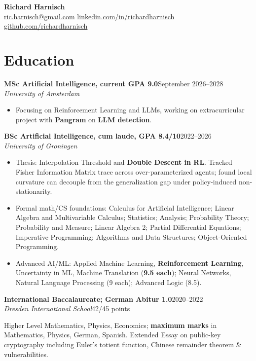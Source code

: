 \documentclass[10pt,a4paper]{article}
\newcommand{\cvheading}[4]{\textbf{#1}\hfill #2\\\emph{#3}\hfill #4\par}
\begin{document}
\begin{center}
    {\LARGE \textbf{Richard Harnisch}}\\[-0.05em]
    \href{mailto:ric.harnisch@gmail.com}{ric.harnisch@gmail.com} \quad
    \href{https://www.linkedin.com/in/richardharnisch}{linkedin.com/in/richardharnisch} \quad
    \href{https://github.com/richardharnisch}{github.com/richardharnisch}
\end{center}

\section*{Education}
\cvheading{MSc Artificial Intelligence, current GPA 9.0}{September 2026--2028}{University of Amsterdam}{}
\begin{itemize}
    \item Focusing on Reinforcement Learning and LLMs, working on extracurricular project with \textbf{Pangram} on \textbf{LLM detection}.
\end{itemize}
\cvheading{BSc Artificial Intelligence, cum laude, GPA 8.4/10}{2022--2026}{University of Groningen}{}
\begin{itemize}
    \item Thesis: Interpolation Threshold and \textbf{Double Descent in RL}. Tracked Fisher Information Matrix trace across over-parameterized agents; found local curvature can decouple from the generalization gap under policy-induced non-stationarity.
    \item Formal math/CS foundations: Calculus for Artificial Intelligence; Linear Algebra and Multivariable Calculus; Statistics; Analysis; Probability Theory; Probability and Measure; Linear Algebra 2; Partial Differential Equations; Imperative Programming; Algorithms and Data Structures; Object-Oriented Programming.
    \item Advanced AI/ML: Applied Machine Learning, \textbf{Reinforcement Learning}, Uncertainty in ML, Machine Translation (\textbf{9.5 each}); Neural Networks, Natural Language Processing (9 each); Advanced Logic (8.5).
\end{itemize}
\cvheading{International Baccalaureate; German Abitur 1.0}{2020--2022}{Dresden International School}{42/45 points}
Higher Level Mathematics, Physics, Economics; \textbf{maximum marks} in Mathematics, Physics, German, Spanish. Extended Essay on public-key cryptography including Euler's totient function, Chinese remainder theorem \& vulnerabilities.
\end{document}
